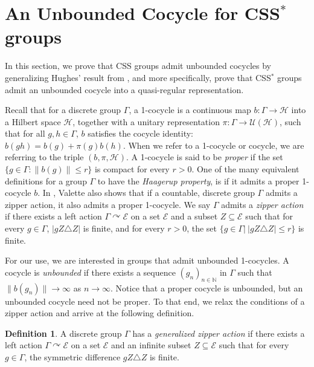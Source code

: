 \documentclass[12pt]{amsart}
\numberwithin{equation}{subsection}
\theoremstyle{definition}
\theoremstyle{definition}
\newtheorem{definition}[theorem]{Definition}
\theoremstyle{remark}
\begin{document}
\section{An Unbounded Cocycle for \texorpdfstring{CSS$^*$}{CSS*} groups}\label{sec:cocycle}


In this section, we prove that CSS groups admit unbounded cocycles by generalizing Hughes' result from \cite{hughes2009}, and more specifically, prove that CSS$^*$ groups admit an unbounded cocycle into a quasi-regular representation. 


Recall that for a discrete group $\Gamma$, a 1-cocycle is a continuous map $b:\Gamma \rightarrow \mathcal H$ into a Hilbert space $\mathcal H$, together with a unitary representation $\pi: \Gamma \rightarrow \mathcal U (\mathcal H)$, such that for all $g,h \in \Gamma$, $b$ satisfies the cocycle identity: $b(gh)=b(g)+\pi(g)b(h)$. When we refer to a 1-cocycle or cocycle, we are referring to the triple $(b,\pi,\mathcal H)$. A 1-cocycle is said to be \textit{proper} if the set $\{g \in \Gamma : \|b(g)\| \leq r\}$ is compact for every $r >0$. One of the many equivalent definitions for a group $\Gamma$ to have the \textit{Haagerup property}, is if it admits a proper 1-cocycle $b$. In \cite[Proposition 7.5.1]{CherixEtall2001}, Valette also shows that if a countable, discrete group $\Gamma$ admits a zipper action, it also admits a proper 1-cocycle. We say $\Gamma$ admits a \textit{zipper action} if there exists a left action $\Gamma \curvearrowright \mathcal E$ on a set $\mathcal E$ and a subset $Z \subseteq \mathcal E$ such that for every $g \in \Gamma$, $\vert gZ \triangle Z\vert$ is finite, and for every $r > 0$, the set $\{g\in \Gamma \vert \:\vert gZ \triangle Z \vert \leq r\}$ is finite. 

For our use, we are interested in groups that admit unbounded 1-cocycles. A cocycle is \textit{unbounded} if there exists a sequence $(g_n)_{n \in \mathbb N}$ in $\Gamma$ such that $\|b(g_n)\| \rightarrow \infty$ as $n \rightarrow \infty$. Notice that a proper cocycle is unbounded, but an unbounded cocycle need not be proper. To that end, we relax the conditions of a zipper action and arrive at the following definition. 


\begin{definition}
    A discrete group $\Gamma$ has a \textit{generalized zipper action} if there exists a left action $\Gamma \curvearrowright \mathcal E$ on a set $\mathcal E$ and an infinite subset $Z \subseteq \mathcal E$ such that for every $g \in \Gamma$, the symmetric difference $gZ \triangle Z$ is finite. 
\end{definition}
\end{document}
